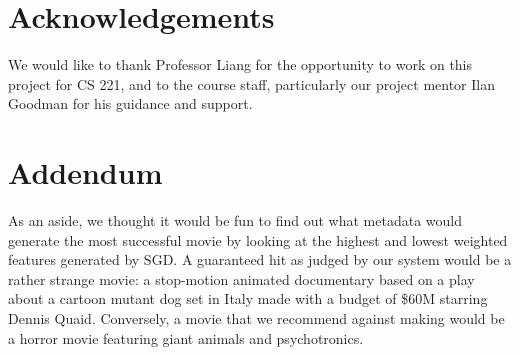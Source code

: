 \documentclass[journal]{IEEEtran}
\begin{document}
\section{Acknowledgements}
We would like to thank Professor Liang for the opportunity to work on this
project for CS 221, and to the course staff, particularly our project mentor
Ilan Goodman for his guidance and support.

\section{Addendum}
As an aside, we thought it would be fun to find out what metadata would
generate the most successful movie by looking at the highest and lowest
weighted features generated by SGD.
A guaranteed hit as judged by our system would be a rather strange movie: a stop-motion animated documentary based on a play about a cartoon mutant dog set in Italy made with a budget of \$60M starring Dennis Quaid. Conversely, a movie that we recommend against making would be a horror movie featuring giant animals and psychotronics.
\end{document}
